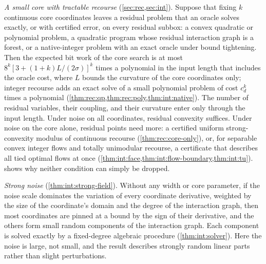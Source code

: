 \emph{A small core with tractable recourse} (\cref{sec:rec,sec:int}).
Suppose that fixing $k$ continuous core coordinates leaves a residual
problem that an oracle solves exactly, or with certified error, on every
residual subbox: a convex quadratic or polynomial problem, a quadratic
program whose residual interaction graph is a forest, or a native-integer
problem with an exact oracle under bound tightening. Then the expected bit
work of the core search is at most $8^k[3+(1+k)L/(2\sigma)]^k$ times a
polynomial in the input length that includes the oracle cost, where $L$
bounds the curvature of the core coordinates only; integer recourse adds an
exact solve of a small polynomial problem of cost $c_d^k$ times a polynomial
(\cref{thm:rec:qp,thm:rec:poly,thm:int:native}). The number of residual
variables, their coupling, and their curvature enter only through the input
length. Under noise on all coordinates, residual convexity suffices. Under
noise on the core alone, residual points need more: a certified uniform
strong-convexity modulus of continuous recourse (\cref{thm:rec:core-only}),
or, for separable convex integer flows and totally unimodular recourse, a
certificate that describes all tied optimal flows at once
(\cref{thm:int:face,thm:int:flow-boundary,thm:int:tu}).
 shows why neither condition can simply be dropped.

\emph{Strong noise} (\cref{thm:int:strong-field}). Without any width or core
parameter, if the noise scale dominates the variation of every coordinate
derivative, weighted by the size of the coordinate's domain and the degree
of the interaction graph, then most coordinates are pinned at a bound by the
sign of their derivative, and the others form small random components of
the interaction graph. Each component is solved exactly by a fixed-degree
algebraic procedure (\cref{thm:int:solver}). Here the noise is large, not
small, and the result describes strongly random linear parts rather than
slight perturbations.

